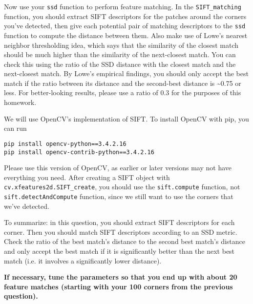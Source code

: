 \documentclass[11pt]{article}
\begin{document}
    Now use your \texttt{ssd} function to perform feature matching. In the
\texttt{SIFT\_matching} function, you should extract SIFT descriptors
for the patches around the corners you've detected, then give each
potential pair of matching descriptors to the \texttt{ssd} function to
compute the distance between them. Also make use of Lowe's nearest
neighbor thresholding idea, which says that the similarity of the
closest match should be much higher than the similarity of the
next-closest match. You can check this using the ratio of the SSD
distance with the closest match and the next-closest match. By Lowe's
empirical findings, you should only accept the best match if the ratio
between its distance and the second-best distance is
\textasciitilde{}0.75 or less. For better-looking results, please use a
ratio of 0.3 for the purposes of this homework.

We will use OpenCV's implementation of SIFT. To install OpenCV with pip,
you can run

\begin{verbatim}
pip install opencv-python==3.4.2.16
pip install opencv-contrib-python==3.4.2.16
\end{verbatim}

Please use this version of OpenCV, as earlier or later versions may not
have everything you need. After creating a SIFT object with
\texttt{cv.xfeatures2d.SIFT\_create}, you should use the
\texttt{sift.compute} function, not \texttt{sift.detectAndCompute}
function, since we still want to use the corners that we've detected.

To summarize: in this question, you should extract SIFT descriptors for
each corner. Then you should match SIFT descriptors according to an SSD
metric. Check the ratio of the best match's distance to the second best
match's distance and only accept the best match if it is significantly
better than the next best match (i.e. it involves a significantly lower
distance).

\textbf{If necessary, tune the parameters so that you end up with about
20 feature matches (starting with your 100 corners from the previous
question).}
\end{document}
